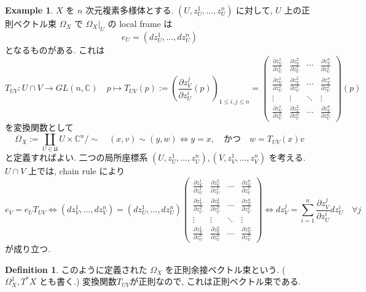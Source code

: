 \documentclass[dvipdfmx,a4paper,11pt]{article} %
\theoremstyle{definition}
\newtheorem{defn}[thm]{Definition}
\newtheorem{example}[thm]{Example}
\theoremstyle{remark}
\numberwithin{equation}{section}
\begin{document}
\begin{example}
\(X\) を \(n\) 次元複素多様体とする.
\(
(U,z_U^1,\ldots,z_U^n)
\)
に対して, \(U\) 上の正則ベクトル束 \(\Omega_{X}\) で \(\Omega_{X}|_{U}\) の local frame は
\[
e_U =\left( dz_U^1, \ldots, dz_U^n \right)
\]
となるものがある. これは
\begin{equation}
T_{UV}\colon U\cap V\longrightarrow GL(n,\mathbb{C})
\quad
p \mapsto
T_{UV}(p):=
\left(
\frac{\partial z_V^j}{\partial z_U^i}(p)
\right)_{1\leq i,j\leq n}
=
\begin{pmatrix}
\frac{\partial z_V^1}{\partial z_U^1}
& \frac{\partial z_V^2}{\partial z_U^1}& \cdots 
& \frac{\partial z_V^n}{\partial z_U^1}\\
\frac{\partial z_V^1}{\partial z_U^2}& \frac{\partial z_V^2}{\partial z_U^2}& \cdots & \frac{\partial z_V^n}{\partial z_U^2}\\
\vdots & \vdots & \ddots & \vdots\\
\frac{\partial z_V^1}{\partial z_U^n}& \frac{\partial z_V^2}{\partial z_U^n}& \cdots & \frac{\partial z_V^n}{\partial z_U^n}
\end{pmatrix}
(p)
\end{equation}
を変換関数として
\[
\Omega_{X}:=\coprod_{U\in\mathfrak{U}} U\times \mathbb{C}^n/
\sim
\quad 
(x,v)\sim (y,w)
\Leftrightarrow
y=x,\quad \text{かつ} \quad w=T_{UV}(x)v 
\]
と定義すればよい. 
二つの局所座標系
\(
(U,z_U^1,\ldots,z_U^n),
(V,z_V^1,\ldots,z_V^n)
\)
を考える. \(U\cap V\) 上では, chain rule により
\begin{equation}
e_V=e_U T_{UV}
\Leftrightarrow
\left( dz_V^1, \ldots, dz_V^n \right)
=
\left( dz_U^1, \ldots, dz_U^n \right)
\begin{pmatrix}
\frac{\partial z_V^1}{\partial z_U^1}
& \frac{\partial z_V^2}{\partial z_U^1}& \cdots 
& \frac{\partial z_V^n}{\partial z_U^1}\\
\frac{\partial z_V^1}{\partial z_U^2}& \frac{\partial z_V^2}{\partial z_U^2}& \cdots & \frac{\partial z_V^n}{\partial z_U^2}\\
\vdots & \vdots & \ddots & \vdots\\
\frac{\partial z_V^1}{\partial z_U^n}& \frac{\partial z_V^2}{\partial z_U^n}& \cdots & \frac{\partial z_V^n}{\partial z_U^n}
\end{pmatrix}
\Leftrightarrow
dz_V^j =\sum_{i=1}^n \frac{\partial z_V^j}{\partial z_U^i}dz_U^i 
\quad \forall j
\end{equation}
が成り立つ.

\begin{defn}
このように定義された \(\Omega_{X}\) を正則余接ベクトル束という. 
(\(\Omega_{X}^{1}, T^{*}X\) とも書く.)
変換関数$T_{UV}$が正則なので, これは正則ベクトル束である. 


\end{defn}
\end{example}
\end{document}
